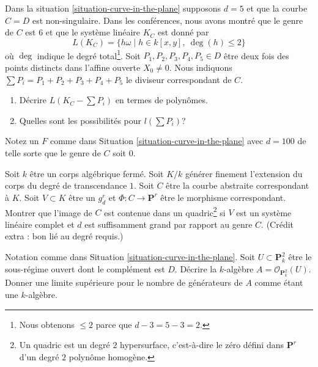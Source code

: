 \begin{exercise}
\label{exercise-smooth-plane-curve-linear-system}
Dans la situation \ref{situation-curve-in-the-plane} supposons $d = 5$ et que la courbe
$C = D$ est non-singulaire. Dans les conférences, nous avons montré que le
genre de $C$ est $6$ et que le système linéaire $K_C$ est donné par
$$
L(K_C) = \{h\omega \mid h \in k[x, y],\ \deg(h) \leq 2\}
$$
où $\deg$ indique le degré total\footnote{Nous obtenons $\leq 2$ parce que $d - 3 =
5 - 3 = 2$.}. Soit $P_1, P_2, P_3, P_4, P_5 \in
D$ être deux fois des points distincts dans l'affine ouverte $X_0 \not = 0$. Nous indiquons $\sum
P_i = P_1 + P_2 + P_3 + P_4 + P_5$ le diviseur correspondant de $C$.
\begin{enumerate}
\item Décrire $L(K_C - \sum P_i)$ en termes de polynômes.
\item Quelles sont les possibilités pour $l(\sum P_i)$?
\end{enumerate}
\end{exercise}

\begin{exercise}
\label{exercise-rational-curve-high-degree}
Notez un $F$ comme dans Situation \ref{situation-curve-in-the-plane} avec $d = 100$ de
telle sorte que le genre de $C$ soit $0$.
\end{exercise}

\begin{exercise}
\label{exercise-high-degree-curve-quadratic-equation}
Soit $k$ être un corps algébrique fermé. Soit $K/k$
générer finement l'extension du corps du degré de transcendance $1$. Soit
$C$ être la courbe abstraite correspondant à $K$.
Soit $V \subset K$ être un $g^r_d$ et $\Phi : C
\to \mathbf{P}^r$ être le morphisme correspondant. Montrer que l'image de
$C$ est contenue dans un quadric\footnote{Un quadric est un degré $2$ hypersurface,
c'est-à-dire le zéro défini dans $\mathbf{P}^r$ d'un degré $2$ polynôme homogène.}
si $V$ est un système linéaire complet
et $d$ est suffisamment grand par rapport au genre $C$.
(Crédit extra : bon lié au degré requis.)
\end{exercise}

\begin{exercise}
\label{exercise-surjective-map-a2-p2}
Notation comme dans Situation \ref{situation-curve-in-the-plane}. Soit $U \subset \mathbf{P}^2_k$
être le sous-régime ouvert dont le complément
est $D$. Décrire la $k$-algèbre $A =
\mathcal{O}_{\mathbf{P}^2_k}(U)$. Donner une limite supérieure pour le nombre de générateurs
de $A$ comme étant une $k$-algèbre.
\end{exercise}



